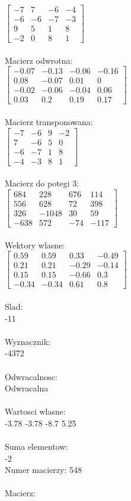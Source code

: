 \documentclass[a4paper,12pt]{article}
\begin{document}
$\begin{bmatrix} -7&7&-6&-4\\-6&-6&-7&-3\\9&5&1&8\\-2&0&8&1 \end{bmatrix}$
\\
\\
Macierz odwrotna:\\

$\begin{bmatrix} -0.07&-0.13&-0.06&-0.16\\0.08&-0.07&0.01&0\\-0.02&-0.06&-0.04&0.06\\0.03&0.2&0.19&0.17 \end{bmatrix}$
\\
\\
Macierz transponowana:\\

$\begin{bmatrix} -7&-6&9&-2\\7&-6&5&0\\-6&-7&1&8\\-4&-3&8&1 \end{bmatrix}$
\\
\\
Macierz do potegi 3:\\

$\begin{bmatrix} 684&228&676&114\\556&628&72&398\\326&-1048&30&59\\-638&572&-74&-117 \end{bmatrix}$
\\
\\
Wektory wlasne:\\

$\begin{bmatrix} 0.59&0.59&0.33&-0.49\\0.21&0.21&-0.29&-0.14\\0.15&0.15&-0.66&0.3\\-0.34&-0.34&0.61&0.8 \end{bmatrix}$
\\
\\
Slad:\\
-11
\\
\\
Wyznacznik:\\
-4372
\\
\\
Odwracalnosc:\\
Odwracalna
\\
\\
Wartosci wlasne:\\
-3.78 -3.78 -8.7 5.25
\\
\\
Suma elementow:\\
-2
\\
\newpage
Numer macierzy:
548
\\
\\
Macierz:\\
\end{document}
